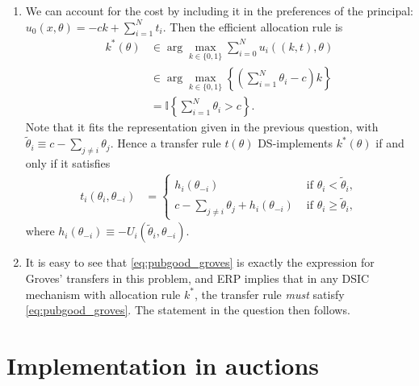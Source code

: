\documentclass[a4paper]{article}
\begin{document}
\begin{enumerate}
	\item We can account for the cost by including it in the preferences of the principal: $u_0(x,\theta) = -c k + \sum_{i=1}^N t_i$. Then the efficient allocation rule is
	\begin{align*}
		k^*(\theta) 
		&\in \arg \max_{k \in \{0,1\}} \sum_{i=0}^N u_i((k,t),\theta)
		\\
		&\in \arg \max_{k \in \{0,1\}} \left\{\left(\sum_{i=1}^N \theta_i - c \right) k \right\}
		\\
		&= \mathbb{I} \left\{ \sum_{i=1}^N \theta_i > c \right\}.
	\end{align*}
	Note that it fits the representation given in the previous question, with $\tilde{\theta}_i \equiv c - \sum_{j\neq i} \theta_j$. Hence a transfer rule $t(\theta)$ DS-implements $k^*(\theta)$ if and only if it satisfies
	\begin{align} \label{eq:pubgood_groves}
		t_i(\theta_i, \theta_{-i}) 
		&= \begin{cases}
			h_i(\theta_{-i}) & \text{ if } \theta_i < \tilde{\theta}_i,
			\\
			c - \sum_{j\neq i} \theta_j + h_i(\theta_{-i}) & \text{ if } \theta_i \geq \tilde{\theta}_i,
		\end{cases}
	\end{align}
	where $h_i(\theta_{-i}) \equiv - U_i(\tilde{\theta}_i, \theta_{-i})$.
	
	\item It is easy to see that \eqref{eq:pubgood_groves} is exactly the expression for Groves' transfers in this problem, and ERP implies that in any DSIC mechanism with allocation rule $k^*$, the transfer rule \emph{must} satisfy \eqref{eq:pubgood_groves}. The statement in the question then follows.
\end{enumerate}
\fi 



\section{Implementation in auctions}
\end{document}
